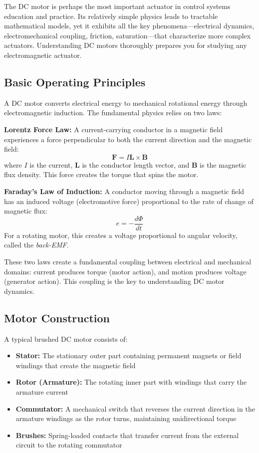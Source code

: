 The DC motor is perhaps the most important actuator in control systems education and practice. Its relatively simple physics leads to tractable mathematical models, yet it exhibits all the key phenomena---electrical dynamics, electromechanical coupling, friction, saturation---that characterize more complex actuators. Understanding DC motors thoroughly prepares you for studying any electromagnetic actuator.

\subsection{Basic Operating Principles}

A DC motor converts electrical energy to mechanical rotational energy through electromagnetic induction. The fundamental physics relies on two laws:

\textbf{Lorentz Force Law:} A current-carrying conductor in a magnetic field experiences a force perpendicular to both the current direction and the magnetic field:
\begin{equation}
    \mathbf{F} = I \mathbf{L} \times \mathbf{B}
\end{equation}
where $I$ is the current, $\mathbf{L}$ is the conductor length vector, and $\mathbf{B}$ is the magnetic flux density. This force creates the torque that spins the motor.

\textbf{Faraday's Law of Induction:} A conductor moving through a magnetic field has an induced voltage (electromotive force) proportional to the rate of change of magnetic flux:
\begin{equation}
    e = -\frac{d\Phi}{dt}
\end{equation}
For a rotating motor, this creates a voltage proportional to angular velocity, called the \textit{back-EMF}.

These two laws create a fundamental coupling between electrical and mechanical domains: current produces torque (motor action), and motion produces voltage (generator action). This coupling is the key to understanding DC motor dynamics.

\subsection{Motor Construction}

A typical brushed DC motor consists of:

\begin{itemize}
    \item \textbf{Stator:} The stationary outer part containing permanent magnets or field windings that create the magnetic field
    \item \textbf{Rotor (Armature):} The rotating inner part with windings that carry the armature current
    \item \textbf{Commutator:} A mechanical switch that reverses the current direction in the armature windings as the rotor turns, maintaining unidirectional torque
    \item \textbf{Brushes:} Spring-loaded contacts that transfer current from the external circuit to the rotating commutator
\end{itemize}

